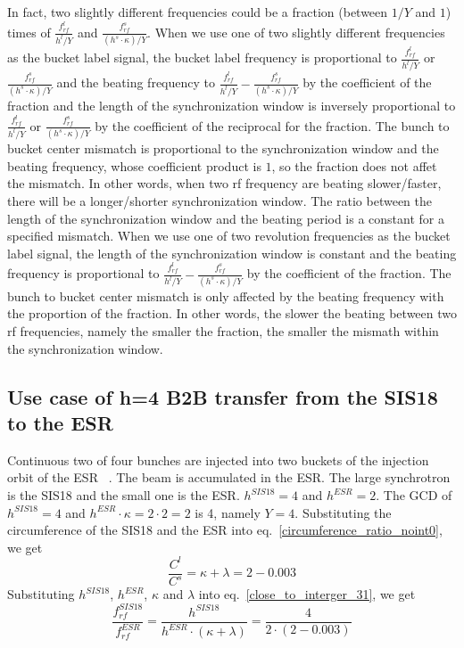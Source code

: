 In fact, two slightly different frequencies could be a fraction (between $1/Y$ and $1$) times of $\frac{f_{\mathit{rf}}^{l}}{h^l/Y}$ and $\frac{f_{\mathit{rf}}^{s}}{(h^s\cdot \kappa)/Y}$. When we use one of two slightly different frequencies as the bucket label signal, the bucket label frequency is proportional to $\frac{f_{\mathit{rf}}^{l}}{h^l/Y}$ or $\frac{f_{\mathit{rf}}^{s}}{(h^s\cdot \kappa)/Y}$ and the beating frequency to $\frac{f_{\mathit{rf}}^{l}}{h^l/Y}-\frac{f_{\mathit{rf}}^{s}}{(h^s\cdot \kappa)/Y}$ by the coefficient of the fraction and the length of the synchronization window is inversely proportional to $\frac{f_{\mathit{rf}}^{l}}{h^l/Y}$ or $\frac{f_{\mathit{rf}}^{s}}{(h^s\cdot \kappa)/Y}$ by the coefficient of the reciprocal for the fraction. The bunch to bucket center mismatch is proportional to the synchronization window and the beating frequency, whose coefficient product is $1$, so the fraction does not affet the mismatch. In other words, when two rf frequency are beating slower/faster, there will be a longer/shorter synchronization window. The ratio between the length of the synchronization window and the beating period is a constant for a specified mismatch. When we use one of two revolution frequencies as the bucket label signal, the length of the synchronization window is constant and the beating frequency is proportional to $\frac{f_{\mathit{rf}}^{l}}{h^l/Y}-\frac{f_{\mathit{rf}}^{s}}{(h^s\cdot \kappa)/Y}$ by the coefficient of the fraction. The bunch to bucket center mismatch is only affected by the beating frequency with the proportion of the fraction. In other words, the slower the beating between two rf frequencies, namely the smaller the fraction, the smaller the mismath within the synchronization window.

\subsection{Use case of h=4 B2B transfer from the SIS18 to the ESR} 
Continuous two of four bunches are injected into two buckets of the injection orbit of the ESR ~\cite{steck_demonstration_2011}. The beam is accumulated in the ESR. The large synchrotron is the SIS18 and the small one is the ESR. $h^{\mathit{SIS18}}=4$ and $h^{\mathit{ESR}}=2$. The GCD of $h^{\mathit{SIS18}}=4$ and $h^{\mathit{ESR}}\cdot \kappa=2\cdot 2=2$ is 4, namely $Y=4$. Substituting the circumference of the SIS18 and the ESR into eq.~\ref{circumference_ratio_noint0}, we get
\begin{equation}
\frac{C^l}{C^s}=\kappa + \lambda =2-0.003
\end{equation}
Substituting $h^{\mathit{SIS18}}$, $h^{\mathit{ESR}}$, $\kappa$ and $\lambda$ into eq.~\ref{close_to_interger_31}, we get
\begin{equation}
\frac {f_{\mathit{rf}}^{\mathit{SIS18}}}{f_{\mathit{rf}}^{\mathit{ESR}}}= \frac{h^{\mathit{SIS18}}}{h^{\mathit{ESR}} \cdot (\kappa+ \lambda)}=\frac {4}{2 \cdot(2-0.003)}
\end{equation}

